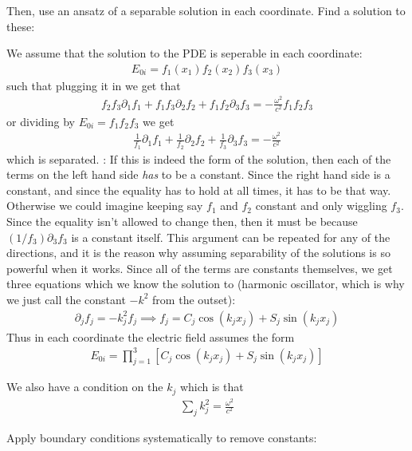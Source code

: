 Then, use an ansatz of a separable solution in each coordinate. Find a solution to these:

We assume that the solution to the PDE is seperable in each coordinate:
\begin{align*}
    E_{0i}  = f_1(x_1) f_2(x_2)f_3(x_3)
\end{align*}
such that plugging it in we get that \begin{align*}
    f_2 f_3 \partial_1 f_1 + f_1 f_3 \partial_2 f_2 + f_1 f_2 \partial_3 f_3 = -\frac{\omega^{2}}{c^{2} } f_1 f_2 f_3 
\end{align*}
or dividing by \(E_{0i} = f_1 f_2 f_3\) we get \begin{align*}
    \frac{1}{f_1}\partial_1 f_1 + \frac{1}{f_2} \partial_2 f_2 + \frac{1}{f_3}\partial_3 f_3 = -\frac{\omega^{2}}{c^{2} }
\end{align*}
which is separated. : If this is indeed the form of the solution, then each of the terms on the left hand side \textit{has} to be a constant. Since the right hand side is a constant, and since the equality has to hold at all times, it has to be that way. Otherwise we could imagine keeping say \(f_1\) and \(f_2\) constant and only wiggling \(f_3\). Since the equality isn't allowed to change then, then it must be because \((1 / f_3)\partial _3 f_3 \) is a constant itself. This argument can be repeated for any of the directions, and it is the reason why assuming separability of the solutions is so powerful when it works. Since all of the terms are constants themselves, we get three equations which we know the solution to (harmonic oscillator, which is why we just call the constant \(-k^{2} \) from the outset):
\begin{align*}
    \boxed{\partial _j f_j = -k^{2}_jf_j \implies f_j = C_j \cos (k_j x_j) + S_j \sin (k_j x_j)}
\end{align*}
Thus in each coordinate the electric field assumes the form \begin{align*}
    E_{0i} = \prod_{j = 1}^3 \left[ C_j \cos (k_j x_j) + S_j \sin (k_j x_j) \right]  
\end{align*}

We also have a condition on the \(k_j\) which is that \begin{align*}
    \sum_{j} k^{2} _j = \frac{\omega^{2}}{c^{2} } 
\end{align*} 

Apply boundary conditions systematically to remove constants:

